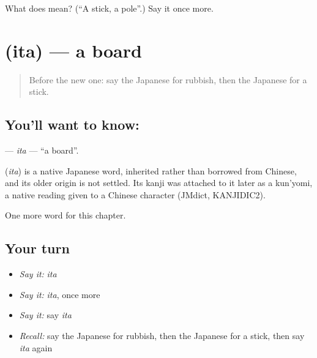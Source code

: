\begin{tcolorbox}[breakable,colback=teal!4,colframe=teal!35!black,title={Before you move on}]
What does  mean? (\textquotedblleft{}A stick, a pole\textquotedblright{}.) Say it once more.
\end{tcolorbox}
\section[\texorpdfstring{\ja{いた} (ita)}{いた (ita)}]{ (ita) — a board}

\label{lesson:JA-C100-ita}



\begin{quote}
Before the new one: say the Japanese for rubbish, then the Japanese for a stick.
\end{quote}

\subsection*{You'll want to know: }
\textbf{} — \emph{ita} — \textquotedblleft{}a board\textquotedblright{}.

\begin{cousinweb}
\textbf{} (\emph{ita}) is a native Japanese word, inherited rather than borrowed from Chinese, and its older origin is not settled. Its kanji was attached to it later as a kun'yomi, a native reading given to a Chinese character (JMdict, KANJIDIC2).
\end{cousinweb}

\begin{grammarlens}[title={What you've built}]
One more word for this chapter.
\end{grammarlens}

\subsection*{Your turn}
\begin{itemize}
\raggedright
  \item \emph{Say it:} \emph{ita}
  \item \emph{Say it:} \emph{ita}, once more
  \item \emph{Say it:} say \emph{ita}
  \item \emph{Recall:} say the Japanese for rubbish, then the Japanese for a stick, then say \emph{ita} again
\end{itemize}

